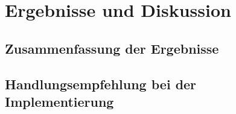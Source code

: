 \newpage
\section{Ergebnisse und Diskussion}\label{lab:ergebnisse}
\subsection{Zusammenfassung der Ergebnisse}
\subsection{Handlungsempfehlung bei der Implementierung}